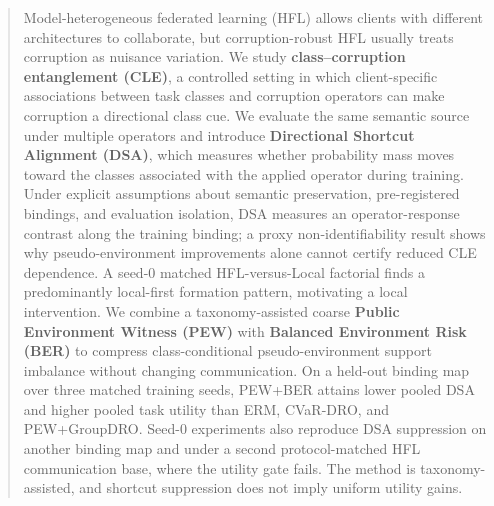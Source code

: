 \begin{abstract}

Model-heterogeneous federated learning (HFL) allows clients with different architectures to collaborate, but corruption-robust HFL usually treats corruption as nuisance variation. We study \textbf{class--corruption entanglement (CLE)}, a controlled setting in which client-specific associations between task classes and corruption operators can make corruption a directional class cue. We evaluate the same semantic source under multiple operators and introduce \textbf{Directional Shortcut Alignment (DSA)}, which measures whether probability mass moves toward the classes associated with the applied operator during training. Under explicit assumptions about semantic preservation, pre-registered bindings, and evaluation isolation, DSA measures an operator-response contrast along the training binding; a proxy non-identifiability result shows why pseudo-environment improvements alone cannot certify reduced CLE dependence. A seed-0 matched HFL-versus-Local factorial finds a predominantly local-first formation pattern, motivating a local intervention. We combine a taxonomy-assisted coarse \textbf{Public Environment Witness (PEW)} with \textbf{Balanced Environment Risk (BER)} to compress class-conditional pseudo-environment support imbalance without changing communication. On a held-out binding map over three matched training seeds, PEW+BER attains lower pooled DSA and higher pooled task utility than ERM, CVaR-DRO, and PEW+GroupDRO. Seed-0 experiments also reproduce DSA suppression on another binding map and under a second protocol-matched HFL communication base, where the utility gate fails. The method is taxonomy-assisted, and shortcut suppression does not imply uniform utility gains.

\end{abstract}
